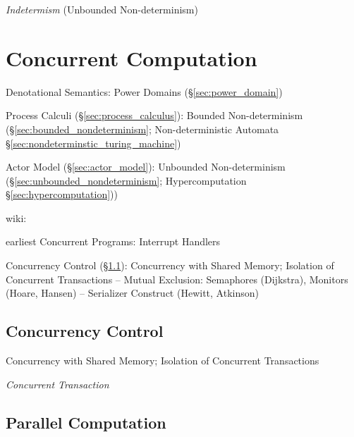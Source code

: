 \emph{Indetermism} (Unbounded Non-determinism)



\section{Concurrent Computation}\label{sec:concurrent_computation}

Denotational Semantics: Power Domains (\S\ref{sec:power_domain})

\fist Process Calculi (\S\ref{sec:process_calculus}): Bounded
Non-determinism (\S\ref{sec:bounded_nondeterminism}; \fist
Non-deterministic Automata \S\ref{sec:nondeterminstic_turing_machine})

\fist Actor Model (\S\ref{sec:actor_model}): Unbounded Non-determinism
(\S\ref{sec:unbounded_nondeterminism}; \fist Hypercomputation
\S\ref{sec:hypercomputation}))

wiki:

earliest Concurrent Programs: Interrupt Handlers %

Concurrency Control (\S\ref{sec:concurrency_control}): Concurrency
with Shared Memory; Isolation of Concurrent Transactions -- Mutual
Exclusion: Semaphores (Dijkstra), Monitors (Hoare, Hansen) --
Serializer Construct (Hewitt, Atkinson)



\subsection{Concurrency Control}\label{sec:concurrency_control}

Concurrency with Shared Memory; Isolation of Concurrent Transactions

\emph{Concurrent Transaction}



\subsection{Parallel Computation}\label{sec:parallel_computation}

